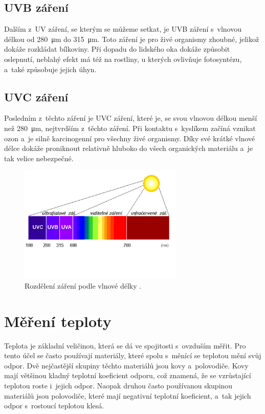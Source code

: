 \subsection{UVB záření}

Dalším z~UV záření, se kterým se můžeme setkat, je UVB záření s~vlnovou délkou od \SI{280}{\micro\metre} do \SI{315}{\micro\metre}. Toto záření je pro živé organismy zhoubné, jelikož dokáže rozkládat bílkoviny. Při dopadu do lidského oka dokáže způsobit oslepnutí, neblahý efekt má též na rostliny, u kterých ovlivňuje fotosyntézu, a~také způsobuje jejich úhyn.

\subsection{UVC záření}

Posledním z~těchto záření je UVC záření, které je, se svou vlnovou délkou menší než \SI{280}{\micro\metre}, nejtvrdším z~těchto záření. Při kontaktu s~kyslíkem začíná vznikat ozon a~je silně karcinogenní pro všechny živé organismy. Díky své krátké vlnové délce dokáže proniknout relativně hluboko do všech organických materiálu a~je tak velice nebezpečné.

\begin{figure}
    \centering
    \includegraphics[width=0.7\textwidth]{obrazky/uv_light.jpg}
    \caption[Rozdělení záření podle vlnové délky.]{Rozdělení záření podle vlnové délky \cite{picture_UVLight}.}
    \label{fig_UVLight}
\end{figure}

\section{Měření teploty}

Teplota je základní veličinou, která se dá ve spojitosti s~ovzduším měřit. Pro tento účel se často používají materiály, které spolu s~měnící se teplotou mění svůj odpor. Dvě nejčastější skupiny těchto materiálů jsou kovy a~polovodiče. Kovy mají většinou kladný teplotní koeficient odporu, což znamená, že se vzrůstající teplotou roste i~jejich odpor. Naopak druhou často používanou skupinou materiálů jsou polovodiče, které mají negativní teplotní koeficient, a~tak jejich odpor s~rostoucí teplotou klesá.

